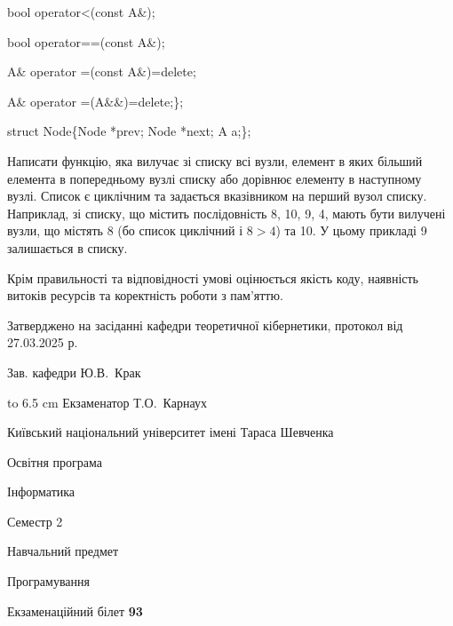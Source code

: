 \documentclass[12pt, ukrainian]{article}
\begin{document}
{\quad  bool operator<(const A\&); 

\quad  bool operator==(const A\&); 

\quad A\& operator =(const A\&)=delete; 

\quad  A\& operator =(A\&\&)=delete;\};

struct Node\{Node *prev; Node *next; A a;\};

Написати функцію, яка вилучає зі списку всі вузли, елемент в яких більший елемента в попередньому вузлі списку або дорівнює елементу в наступному вузлі. Список є циклічним та задається вказівником на перший вузол списку. Наприклад, зі списку, що містить послідовність 8, 10, 9, 4, мають бути вилучені вузли, що містять 8 (бо список циклічний і $8>4$) та 10. У цьому прикладі 9 залишається в списку.

Крім правильності та відповідності умові оцінюється якість коду, наявність витоків ресурсів та коректність роботи з пам'яттю. 

}
{\smallskip\smallskip \begin {scriptsize} Затверджено на засіданні кафедри теоретичної кібернетики, протокол   від   27.03.2025 р.\par\smallskip\smallskip\smallskip\smallskip
{\parbox {6.5 cm} {Зав. кафедри \dotfill Ю.В.~Крак}}\hspace {0.7cm} {\hbox to 6.5 cm { Екзаменатор \dotfill Т.О.~Карнаух}} \end{scriptsize}}
\newpage
{{\begin {scriptsize}\par
{ \center  Київський національний університет імені Тараса Шевченка \par}
{\parbox {5 cm}{Освітня програма \hfill}{\parbox {7 cm}{Інформатика\hfill}}\parbox {6 cm}{\hfill Семестр 2}}\par
{\parbox {5 cm} {Навчальний предмет \hfill}\parbox {7 cm}{Програмування \hfill}\parbox {6cm}{\hfill}\par}\vspace{-15pt} \end{scriptsize}}{\center Екзаменаційний білет \No \textbf { 93 }\par}}
\end{document}
